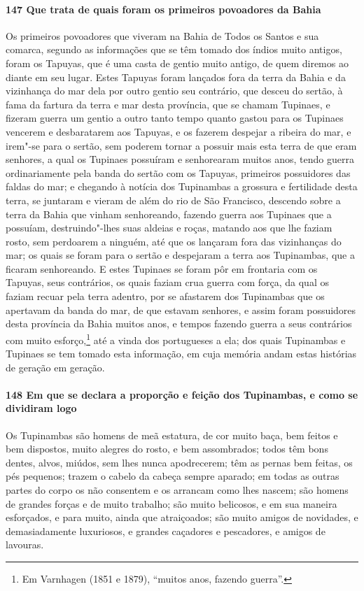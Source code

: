 \begin{linenumbers}
\paragraph{147 Que trata de quais foram os primeiros povoadores da Bahia}\quad
Os primeiros povoadores que viveram na Bahia de Todos os Santos e sua comarca, segundo as
informações que se têm tomado dos índios muito antigos, foram os Tapuyas, que é uma casta
de gentio muito antigo, de quem diremos ao diante em seu lugar. Estes Tapuyas foram
lançados fora da terra da Bahia e da vizinhança do mar dela por outro gentio seu
contrário, que desceu do sertão, à fama da fartura da terra e mar desta província, que se
chamam Tupinaes, e fizeram guerra um gentio a outro tanto tempo quanto gastou para os
Tupinaes vencerem e desbaratarem aos Tapuyas, e os fazerem despejar a ribeira do mar, e
irem"-se para o sertão, sem poderem tornar a possuir mais esta terra de que eram senhores,
a qual os Tupinaes possuíram e senhorearam muitos anos, tendo guerra ordinariamente pela
banda do sertão com os Tapuyas, primeiros possuidores das faldas do mar; e chegando à
notícia dos Tupinambas a grossura e fertilidade desta terra, se juntaram e vieram de além
do rio de São Francisco, descendo sobre a terra da Bahia que vinham senhoreando, fazendo
guerra aos Tupinaes que a possuíam, destruindo"-lhes suas aldeias e roças, matando aos que
lhe faziam rosto, sem perdoarem a ninguém, até que os lançaram fora das vizinhanças do
mar; os quais se foram para o sertão e despejaram a terra aos Tupinambas, que a ficaram
senhoreando. E estes Tupinaes se foram pôr em frontaria com os Tapuyas, seus contrários,
os quais faziam crua guerra com força, da qual os faziam recuar pela terra adentro, por se
afastarem dos Tupinambas que os apertavam da banda do mar, de que estavam senhores, e
assim foram possuidores desta província da Bahia muitos anos, e tempos fazendo guerra a
seus contrários com muito esforço,\footnote{ Em Varnhagen (1851 e 1879), ``muitos anos,
fazendo guerra''.} até a vinda dos portugueses a ela; dos quais Tupinambas e Tupinaes se
tem tomado esta informação, em cuja memória andam estas histórias de geração em geração.

\paragraph{148 Em que se declara a proporção e feição dos Tupinambas, e como se dividiram
logo}\quad
Os Tupinambas são homens de meã estatura, de cor muito baça, bem feitos e bem dispostos,
muito alegres do rosto, e bem assombrados; todos têm bons dentes, alvos, miúdos, sem lhes
nunca apodrecerem; têm as pernas bem feitas, os pés pequenos; trazem o cabelo da cabeça
sempre aparado; em todas as outras partes do corpo os não consentem e os arrancam como
lhes nascem; são homens de grandes forças e de muito trabalho; são muito belicosos, e em
sua maneira esforçados, e para muito, ainda que atraiçoados; são muito amigos de
novidades, e demasiadamente luxuriosos, e grandes caçadores e pescadores, e amigos de
lavouras.


\end{linenumbers}
